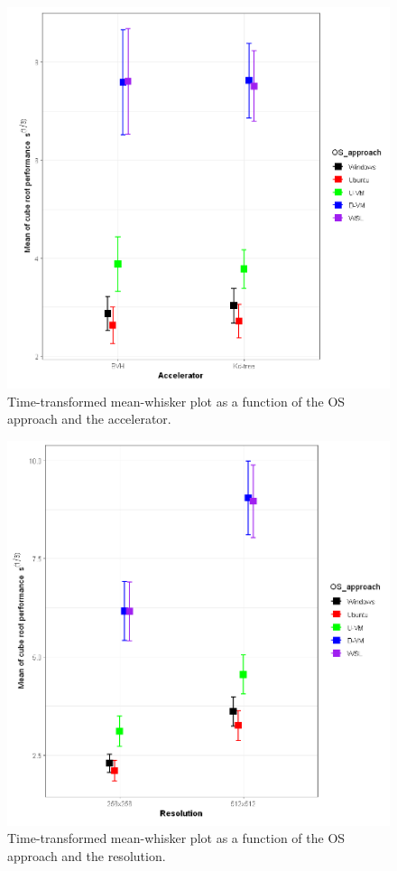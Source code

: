 \documentclass[conference]{IEEEtran}
\begin{document}
\begin{figure}[tb]
    \centering
    \includegraphics[scale=0.5]{figures/mean3.PNG}
    \caption{Time-transformed mean-whisker plot as a function of the OS approach and the accelerator.}
    \label{fig_mean_3}
\end{figure}

\begin{figure}[tb]
    \centering
    \includegraphics[scale=0.5]{figures/mean4.PNG}
    \caption{Time-transformed mean-whisker plot as a function of the OS approach and the resolution.}
    \label{fig_mean_4}
\end{figure}
\end{document}

